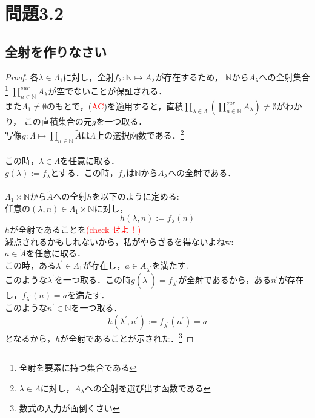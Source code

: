 \documentclass{jarticle}
\begin{document}
\section{問題3.2}
\subsection{全射を作りなさい}
\begin{proof}
	各$\lambda \in \Lambda_1$に対し，全射$f_\lambda : \mathbb{N} \mapsto A_\lambda$が存在するため，
	$\mathbb{N}$から$A_\lambda$への全射集合\footnote{全射を要素に持つ集合である} $\prod\limits_{n \in \mathbb{N}}^{sur} A_\lambda$が空でないことが保証される．\\
	また$\Lambda_1 \neq \emptyset$のもとで，(\textcolor{red}{AC})を適用すると，直積$\prod\limits_{\lambda \in \Lambda}(\prod\limits_{n \in \mathbb{N}}^{sur} A_\lambda) \neq \emptyset$がわかり，
	この直積集合の元$g$を一つ取る．\\
	写像$g : \Lambda \mapsto \prod\limits_{n \in \mathbb{N} } \tilde{A}$は$\Lambda$上の選択函数である．\footnote{$\lambda \in \Lambda$に対し，$A_\lambda$への全射を選び出す函数である}\\
	\\
	この時，$\lambda \in \Lambda$を任意に取る．\\
	$g(\lambda):=f_\lambda$とする．この時，$f_\lambda $は$\mathbb{N}$から$A_\lambda$への全射である．\\
	\\
	$\Lambda_1 \times \mathbb{N} $から$\tilde{A}$への全射$h$を以下のように定める:\\
	任意の$(\lambda , n) \in \Lambda_1 \times \mathbb{N}$に対し，\\
	$$
	h(\lambda,n):=f_\lambda(n)
	$$
	$h$が全射であることを\textcolor{red}{(check せよ！)}\\
	減点されるかもしれないから，私がやらざるを得ないよねw:\\
	$a \in \tilde{A}$を任意に取る．\\
	この時，ある$\lambda^{'} \in \Lambda_1$が存在し，$a \in A_{\lambda^{'}}$を満たす.\\
	このような$\lambda^{'}$を一つ取る．この時$g(\lambda^{'})=f_{\lambda^{'}}$が全射であるから，ある$n^{'}$が存在し，$f_{\lambda^{'}}(n) = a$を満たす．\\ このような$n^{'} \in \mathbb{N}$を一つ取る．\\
	$$
	h(\lambda^{'} ,n^{'}) := f_{\lambda^{'}}(n^{'}) = a
	$$
	となるから，$h$が全射であることが示された．\footnote{数式の入力が面倒くさい}
\end{proof}
\end{document}
